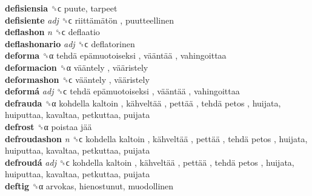 \textbf{defisiensia} ␝ϲ  puute, tarpeet  \\
\textbf{defisiente} \emph{adj}  ␝ϲ   riittämätön , puutteellinen  \\
\textbf{deflashon} \emph{n}  ␝ϲ  deflaatio  \\
\textbf{deflashonario} \emph{adj}  ␝ϲ  deflatorinen  \\
\textbf{deforma} ␝α   tehdä epämuotoiseksi ,  vääntää , vahingoittaa  \\
\textbf{deformacion} ␝α   vääntely ,  vääristely   \\
\textbf{deformashon} ␝ϲ   vääntely ,  vääristely   \\
\textbf{deformá} \emph{adj}  ␝ϲ   tehdä epämuotoiseksi ,  vääntää , vahingoittaa  \\
\textbf{defrauda} ␝α   kohdella kaltoin ,  kähveltää ,  pettää ,  tehdä petos , huijata, huiputtaa, kavaltaa, petkuttaa, puijata  \\
\textbf{defrost} ␝α   poistaa jää   \\
\textbf{defroudashon} \emph{n}  ␝ϲ   kohdella kaltoin ,  kähveltää ,  pettää ,  tehdä petos , huijata, huiputtaa, kavaltaa, petkuttaa, puijata  \\
\textbf{defroudá} \emph{adj}  ␝ϲ   kohdella kaltoin ,  kähveltää ,  pettää ,  tehdä petos , huijata, huiputtaa, kavaltaa, petkuttaa, puijata  \\
\textbf{deftig} ␝α  arvokas, hienostunut, muodollinen  \\
